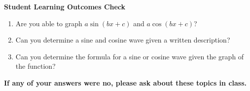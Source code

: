 \clearpage
\noindent \textbf{Student Learning Outcomes Check}

\begin{enumerate}
\item Are you able to graph $a\sin(bx+c)$ and $a\cos(bx+c)$?
\item Can you determine a sine and cosine wave given a written description?
\item Can you determine the formula for a sine or cosine wave given the graph of the function?

\end{enumerate}

\noindent \textbf{If any of your answers were no, please ask about these topics in class.}

